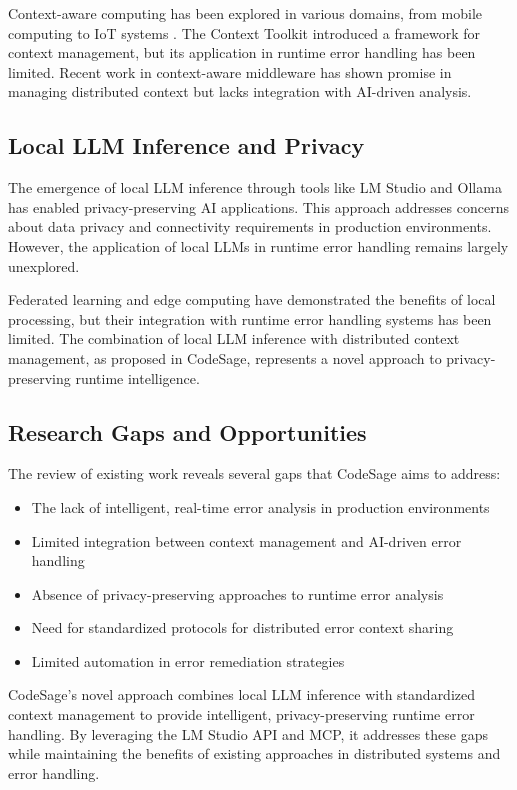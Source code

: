 Context-aware computing has been explored in various domains, from mobile computing \cite{contextaware2001} to IoT systems \cite{iotcontext2018}. The Context Toolkit \cite{contexttoolkit2001} introduced a framework for context management, but its application in runtime error handling has been limited. Recent work in context-aware middleware \cite{contextmiddleware2022} has shown promise in managing distributed context but lacks integration with AI-driven analysis.

\subsection{Local LLM Inference and Privacy}
The emergence of local LLM inference through tools like LM Studio \cite{lmstudio2023} and Ollama \cite{ollama2023} has enabled privacy-preserving AI applications. This approach addresses concerns about data privacy and connectivity requirements in production environments. However, the application of local LLMs in runtime error handling remains largely unexplored.

Federated learning \cite{federated2017} and edge computing \cite{edge2018} have demonstrated the benefits of local processing, but their integration with runtime error handling systems has been limited. The combination of local LLM inference with distributed context management, as proposed in CodeSage, represents a novel approach to privacy-preserving runtime intelligence.

\subsection{Research Gaps and Opportunities}
The review of existing work reveals several gaps that CodeSage aims to address:

\begin{itemize}
    \item The lack of intelligent, real-time error analysis in production environments
    \item Limited integration between context management and AI-driven error handling
    \item Absence of privacy-preserving approaches to runtime error analysis
    \item Need for standardized protocols for distributed error context sharing
    \item Limited automation in error remediation strategies
\end{itemize}

CodeSage's novel approach combines local LLM inference with standardized context management to provide intelligent, privacy-preserving runtime error handling. By leveraging the LM Studio API and MCP, it addresses these gaps while maintaining the benefits of existing approaches in distributed systems and error handling. 